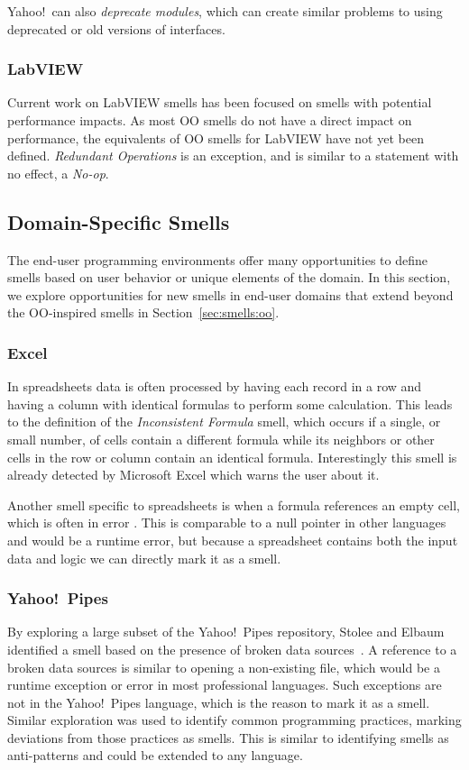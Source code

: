 \documentclass[10pt,conference,compsocconf]{IEEEtran}
\begin{document}
Yahoo!\ can also \emph{deprecate modules}, which can create similar problems to using deprecated or old versions of interfaces.

\subsubsection{LabVIEW}

Current work on LabVIEW smells has been focused on smells with potential performance impacts.
As most OO smells do not have a direct impact on performance, the equivalents of OO smells for LabVIEW have not yet been defined.
\emph{Redundant Operations} is an exception, and is similar to a statement with no effect, a \emph{No-op}.

\subsection{Domain-Specific Smells}
\label{sec:smells:domain}
The end-user programming environments offer many opportunities to define smells based on user behavior or unique elements of the domain.
In this section, we explore opportunities for new smells in end-user domains that extend beyond the OO-inspired smells in Section~\ref{sec:smells:oo}. 

\subsubsection{Excel}

In spreadsheets data is often processed by having each record in a row and having a column with identical formulas to perform some calculation.
This leads to the definition of the \emph{Inconsistent Formula} smell, which occurs if a single, or small number, of cells contain a different formula while its neighbors or other cells in the row or column contain an identical formula.
Interestingly this smell is already detected by Microsoft Excel which warns the user about it.

Another smell specific to spreadsheets is when a formula references an empty cell, which is often in error \cite{cunha2012towards}.
This is comparable to a null pointer in other languages and would be a runtime error, but because a spreadsheet contains both the input data and logic we can directly mark it as a smell.

\subsubsection{Yahoo!\ Pipes}
By exploring a large subset of the Yahoo!\ Pipes repository, Stolee and Elbaum identified a smell based on the presence of broken data sources~\cite{StoleeTSE2013}.
A reference to a broken data sources  is similar to opening a non-existing file, which would be a runtime exception or error in most professional languages.
Such exceptions are not in the Yahoo!\ Pipes language, which is the reason to mark it as a smell. 
Similar exploration was used to  identify common programming practices, marking deviations from those practices as smells. 
This is similar to identifying  smells  as anti-patterns  and could be extended to any language. 
\end{document}
